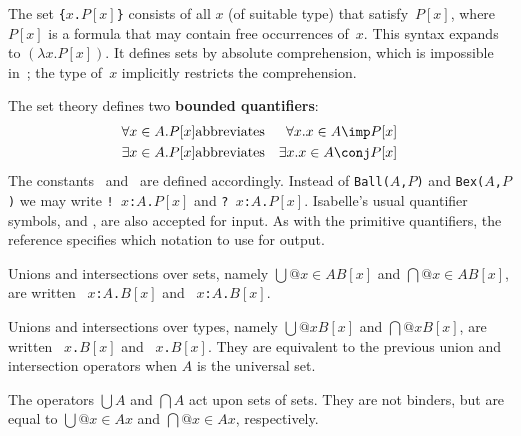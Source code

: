 The set \hbox{\tt\{$x$.$P[x]$\}} consists of all $x$ (of suitable type)
that satisfy~$P[x]$, where $P[x]$ is a formula that may contain free
occurrences of~$x$.  This syntax expands to $(\lambda
x.P[x])$.  It defines sets by absolute comprehension, which is impossible
in~{\ZF}; the type of~$x$ implicitly restricts the comprehension.

The set theory defines two {\bf bounded quantifiers}:
\begin{eqnarray*}
   \forall x\in A.P[x] &\hbox{abbreviates}& \forall x. x\in A\imp P[x] \\
   \exists x\in A.P[x] &\hbox{abbreviates}& \exists x. x\in A\conj P[x]
\end{eqnarray*}
The constants~ and~ are defined
accordingly.  Instead of {\tt Ball($A$,$P$)} and {\tt Bex($A$,$P$)} we may
write
%
\hbox{\tt !~$x$:$A$.$P[x]$} and \hbox{\tt ?~$x$:$A$.$P[x]$}.  Isabelle's
usual quantifier symbols,  and , are also accepted
for input.  As with the primitive quantifiers, the {\ML} reference
 specifies which notation to use for output.

Unions and intersections over sets, namely $\bigcup@{x\in A}B[x]$ and
$\bigcap@{x\in A}B[x]$, are written 
~\hbox{\tt$x$:$A$.$B[x]$} and
~\hbox{\tt$x$:$A$.$B[x]$}.  

Unions and intersections over types, namely $\bigcup@x B[x]$ and $\bigcap@x
B[x]$, are written ~\hbox{\tt$x$.$B[x]$} and
~\hbox{\tt$x$.$B[x]$}.  They are equivalent to the previous
union and intersection operators when $A$ is the universal set.

The operators $\bigcup A$ and $\bigcap A$ act upon sets of sets.  They are
not binders, but are equal to $\bigcup@{x\in A}x$ and $\bigcap@{x\in A}x$,
respectively.


